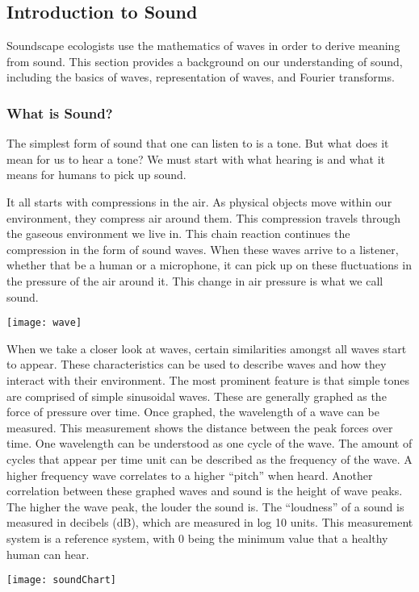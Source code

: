 \subsection{Introduction to Sound}
Soundscape ecologists use the mathematics of waves in order to derive meaning from sound. This section provides a background on our understanding of sound, including the basics of waves, representation of waves, and Fourier transforms.

\subsubsection{What is Sound?}
The simplest form of sound that one can listen to is a tone. But what does it mean for us to hear a tone? We must start with what hearing is and what it means for humans to pick up sound.\par
It all starts with compressions in the air. As physical objects move within our environment, they compress air around them. This compression travels through the gaseous environment we live in. This chain reaction continues the compression in the form of sound waves. When these waves arrive to a listener, whether that be a human or a microphone, it can pick up on these fluctuations in the pressure of the air around it. This change in air pressure is what we call sound.
\begin{center}
  \texttt{[image: wave]} \\[12pt]
\end{center}
\cite{villanueva}
When we take a closer look at waves, certain similarities amongst all waves start to appear. These characteristics can be used to describe waves and how they interact with their environment. The most prominent feature is that simple tones are comprised of simple sinusoidal waves. These are generally graphed as the force of pressure over time. Once graphed, the wavelength of a wave can be measured. This measurement shows the distance between the peak forces over time. One wavelength can be understood as one cycle of the wave. The amount of cycles that appear per time unit can be described as the frequency of the wave. A higher frequency wave correlates to a higher ``pitch'' when heard. Another correlation between these graphed waves and sound is the height of wave peaks. The higher the wave peak, the louder the sound is. The ``loudness'' of a sound is measured in decibels (dB), which are measured in log 10 units. This measurement system is a reference system, with 0 being the minimum value that a healthy human can hear.\cite{villanueva}
\begin{center}
  \texttt{[image: soundChart]} \\[12pt]
	\cite{sound}
\end{center}

